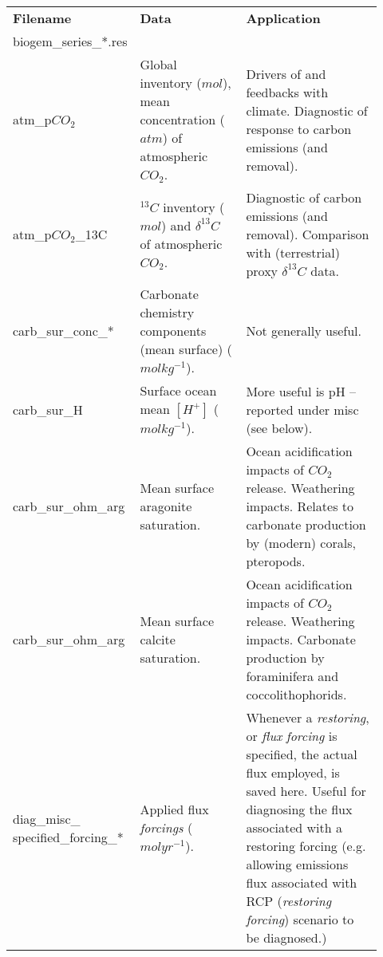 \begin{table}[ht!]
\begin{tabular}{p{0.2\linewidth} p{0.317\linewidth} p{0.4\linewidth}}
\toprule
\textbf{Filename} & \textbf{Data} & \textbf{Application}\\
\textsf{\footnotesize biogem\_series\_*.res} & &\\
\midrule

\textsf{\footnotesize atm\_p\(CO_{2}\)} & \small{Global inventory (\(mol\)), mean concentration (\(atm\)) of atmospheric \(CO_{2}\). } & \small{Drivers of and feedbacks with climate. Diagnostic of response to carbon emissions (and removal).}\\
\textsf{\footnotesize atm\_p\(CO_{2}\)\_13C} & \small{\(^{13}C\) inventory (\(mol\)) and \(\delta^{13}C\) of atmospheric \(CO_{2}\).} & \small{Diagnostic of carbon emissions (and removal). Comparison with (terrestrial) proxy \(\delta^{13}C\) data.}\\

\midrule

\textsf{\footnotesize carb\_sur\_conc\_*} & \small{Carbonate chemistry components (mean surface) (\(molkg^{-1}\)).} & \small{Not generally useful. }\\
\textsf{\footnotesize carb\_sur\_H} & \small{Surface ocean mean \([H^{+}]\) (\(molkg^{-1}\)).} & \small{More useful is pH -- reported under \textsf{\footnotesize misc} (see below). }\\
\textsf{\footnotesize carb\_sur\_ohm\_arg} & \small{Mean surface aragonite saturation.} & \small{Ocean acidification impacts of \(CO_{2}\) release. Weathering impacts. Relates to carbonate production by (modern) corals, pteropods.}\\
\textsf{\footnotesize carb\_sur\_ohm\_arg} & \small{Mean surface calcite saturation.} & \small{Ocean acidification impacts of \(CO_{2}\) release. Weathering impacts. Carbonate production by foraminifera and coccolithophorids.}\\

\midrule

\textsf{\footnotesize diag\_misc\_} \hspace{1cm} \textsf{\footnotesize specified\_forcing\_*}  & \small{Applied flux \textit{forcings} (\(molyr^{-1}\)).} & \small{Whenever a \textit{restoring}, or \textit{flux} \textit{forcing} is specified, the actual flux employed, is saved here. Useful for diagnosing the flux associated with a restoring forcing (e.g. allowing  emissions flux associated with RCP (\textit{restoring forcing}) scenario to be diagnosed.)}\\


\end{tabular}
\end{table}
